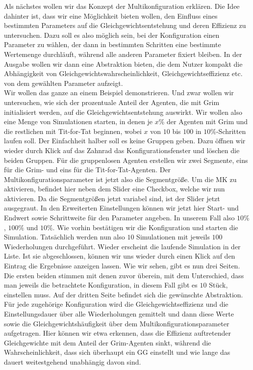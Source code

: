 \documentclass[parskip=full,11pt]{scrartcl}
\begin{document}
Als nächstes wollen wir das Konzept der Multikonfiguration erklären. Die Idee dahinter ist, dass wir eine Möglichkeit bieten wollen, den Einfluss eines bestimmten Parameters auf die Gleichgewichtsentstehung und deren Effizienz zu untersuchen. Dazu soll es also möglich sein, bei der Konfiguration einen Parameter zu wählen, der dann in bestimmten Schritten eine bestimmte Wertemenge durchläuft, während alle anderen Parameter fixiert bleiben. In der Ausgabe wollen wir dann eine Abstraktion bieten, die dem Nutzer kompakt die Abhängigkeit von Gleichgewichtswahrscheinlichkeit, Gleichgewichtseffizienz etc. von dem gewählten Parameter aufzeigt.\\
Wir wollen das ganze an einem Beispiel demonstrieren. Und zwar wollen wir untersuchen, wie sich der prozentuale Anteil der Agenten, die mit Grim initialisiert werden, auf die Gleichgewichtsentstehung auswirkt. Wir wollen also eine Menge von Simulationen starten, in denen je \(x\%\) der Agenten mit Grim und die restlichen mit Tit-for-Tat beginnen, wobei \(x\) von \(10\) bis \(100\) in \(10\%\)-Schritten laufen soll. Der Einfachheit halber soll es keine Gruppen geben. Dazu öffnen wir wieder durch Klick auf das Zahnrad das Konfigurationsfenster und löschen die beiden Gruppen. Für die gruppenlosen Agenten erstellen wir zwei Segmente, eins für die Grim- und eins für die Tit-for-Tat-Agenten. Der Multikonfigurationsparameter ist jetzt also die Segmentgröße. Um die MK zu aktivieren, befindet hier neben dem Slider eine Checkbox, welche wir nun aktivieren. Da die Segmentgrößen jetzt variabel sind, ist der Slider jetzt ausgegraut. In den Erweiterten Einstellungen können wir jetzt hier Start- und Endwert sowie Schrittweite für den Parameter angeben. In unserem Fall also \(10\%\), \(100\%\) und \(10\%\). Wie vorhin bestätigen wir die Konfiguration und starten die Simulation. Tatsächlich werden nun also \(10\) Simulationen mit jeweils \(100\) Wiederholungen durchgeführt. Wieder erscheint die laufende Simulation in der Liste. Ist sie abgeschlossen, können wir uns wieder durch einen Klick auf den Eintrag die Ergebnisse anzeigen lassen. Wie wir sehen, gibt es nun drei Seiten. Die ersten beiden stimmen mit denen zuvor überein, mit dem Unterschied, dass man jeweils die betrachtete Konfiguration, in diesem Fall gibt es \(10\) Stück, einstellen muss. Auf der dritten Seite befindet sich die gewünschte Abstraktion. Für jede zugehörige Konfiguration wird die Gleichgewichtseffizienz und die Einstellungsdauer über alle Wiederholungen gemittelt und dann diese Werte sowie die Gleichgewichtshäufigkeit über dem Multikonfigurationsparameter aufgetragen. Hier können wir etwa erkennen, dass die Effizienz auftretender Gleichgewichte mit dem Anteil der Grim-Agenten sinkt, während die Wahrscheinlichkeit, dass sich überhaupt ein GG einstellt und wie lange das dauert weitestgehend unabhängig davon sind.
\end{document}
